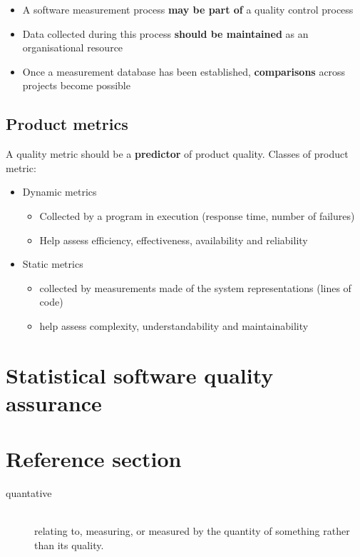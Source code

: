 \documentclass{article}
\begin{document}
\begin{itemize}
  \item A software measurement process \textbf{may be part of} a quality control process
  \item Data collected during this process \textbf{should be maintained} as an organisational resource
  \item Once a measurement database has been established, \textbf{comparisons} across projects become possible
\end{itemize}

\subsection{Product metrics}

\begin{flushleft}
A quality metric should be a \textbf{predictor} of product quality. Classes of product metric:
\begin{itemize}
  \item Dynamic metrics
  \begin{itemize}
    \item Collected by a program in execution (response time, number of failures)
    \item Help assess efficiency, effectiveness, availability and reliability
  \end{itemize}
  \item Static metrics
  \begin{itemize}
    \item collected by measurements made of the system representations (lines of code)
    \item help assess complexity, understandability and maintainability
  \end{itemize}
\end{itemize}
\end{flushleft}

\section{Statistical software quality assurance}

\pagebreak
\section*{Reference section} \label{sec:reference}
\begin{description}
	\item[quantative] \hfill \\ relating to, measuring, or measured by the quantity of something rather than its quality.
\end{description}
\end{document}

